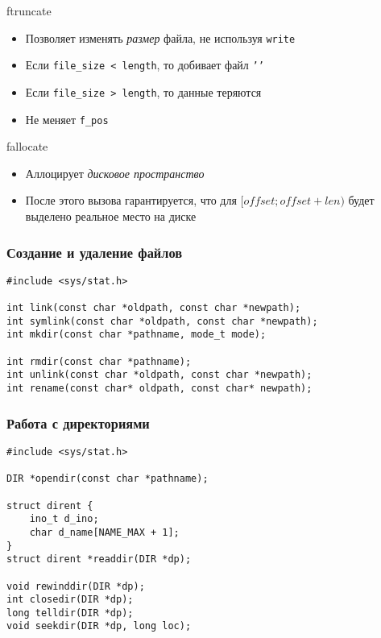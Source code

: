 \documentclass[10pt,pdf,hyperref={unicode}]{beamer}
\begin{document}
\begin{frame}{ftruncate}
\begin{itemize}
    \item Позволяет изменять \emph{размер} файла, не используя \texttt{write}
    \item Если \texttt{file_size < length}, то добивает файл \texttt{'\0'}
    \item Если \texttt{file_size > length}, то данные теряются
    \item Не меняет \texttt{f_pos}
\end{itemize}
\end{frame}

\begin{frame}{fallocate}
\begin{itemize}
    \item Аллоцирует \emph{дисковое пространство}
    \item После этого вызова гарантируется, что для $[offset; offset + len)$ будет выделено реальное место на диске
\end{itemize}
\end{frame}

\begin{frame}[fragile]
\frametitle{Создание и удаление файлов}
\begin{center}
    \begin{minipage}{0.95\textwidth}
        \begin{verbatim}
#include <sys/stat.h>

int link(const char *oldpath, const char *newpath);
int symlink(const char *oldpath, const char *newpath);
int mkdir(const char *pathname, mode_t mode);

int rmdir(const char *pathname);
int unlink(const char *oldpath, const char *newpath);
int rename(const char* oldpath, const char* newpath);
        \end{verbatim}
    \end{minipage}
\end{center}
\end{frame}

\begin{frame}[fragile]
\frametitle{Работа с директориями}
\begin{center}
    \begin{minipage}{0.95\textwidth}
        \begin{verbatim}
#include <sys/stat.h>

DIR *opendir(const char *pathname);

struct dirent {
    ino_t d_ino;
    char d_name[NAME_MAX + 1];
}
struct dirent *readdir(DIR *dp);

void rewinddir(DIR *dp);
int closedir(DIR *dp);
long telldir(DIR *dp);
void seekdir(DIR *dp, long loc);
        \end{verbatim}
    \end{minipage}
\end{center}
\end{frame}
\end{document}
